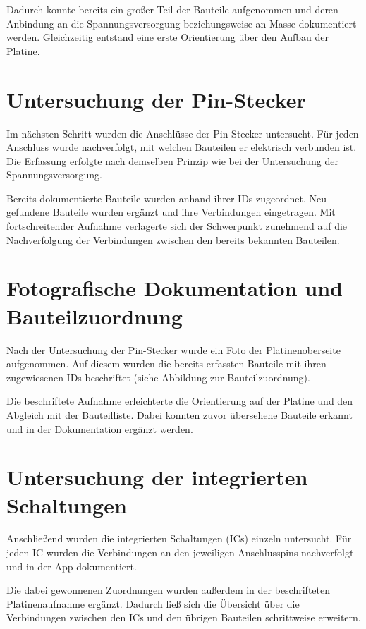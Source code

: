 Dadurch konnte bereits ein großer Teil der Bauteile aufgenommen und deren Anbindung an die Spannungsversorgung beziehungsweise an Masse dokumentiert werden.
Gleichzeitig entstand eine erste Orientierung über den Aufbau der Platine.

\section{Untersuchung der Pin-Stecker}\label{sec:untersuchung-der-pin-stecker}
Im nächsten Schritt wurden die Anschlüsse der Pin-Stecker untersucht.
Für jeden Anschluss wurde nachverfolgt, mit welchen Bauteilen er elektrisch verbunden ist.
Die Erfassung erfolgte nach demselben Prinzip wie bei der Untersuchung der Spannungsversorgung.

Bereits dokumentierte Bauteile wurden anhand ihrer IDs zugeordnet.
Neu gefundene Bauteile wurden ergänzt und ihre Verbindungen eingetragen.
Mit fortschreitender Aufnahme verlagerte sich der Schwerpunkt zunehmend auf die Nachverfolgung der Verbindungen zwischen den bereits bekannten Bauteilen.

\section{Fotografische Dokumentation und Bauteilzuordnung}\label{sec:fotografische-dokumentation-und-bauteilzuordnung}
Nach der Untersuchung der Pin-Stecker wurde ein Foto der Platinenoberseite aufgenommen.
Auf diesem wurden die bereits erfassten Bauteile mit ihren zugewiesenen IDs beschriftet (siehe Abbildung zur Bauteilzuordnung).

Die beschriftete Aufnahme erleichterte die Orientierung auf der Platine und den Abgleich mit der Bauteilliste.
Dabei konnten zuvor übersehene Bauteile erkannt und in der Dokumentation ergänzt werden.

\section{Untersuchung der integrierten Schaltungen}\label{sec:untersuchung-der-integrierten-schaltungen}
Anschließend wurden die integrierten Schaltungen (ICs) einzeln untersucht.
Für jeden IC wurden die Verbindungen an den jeweiligen Anschlusspins nachverfolgt und in der App dokumentiert.

Die dabei gewonnenen Zuordnungen wurden außerdem in der beschrifteten Platinenaufnahme ergänzt.
Dadurch ließ sich die Übersicht über die Verbindungen zwischen den ICs und den übrigen Bauteilen schrittweise erweitern.

